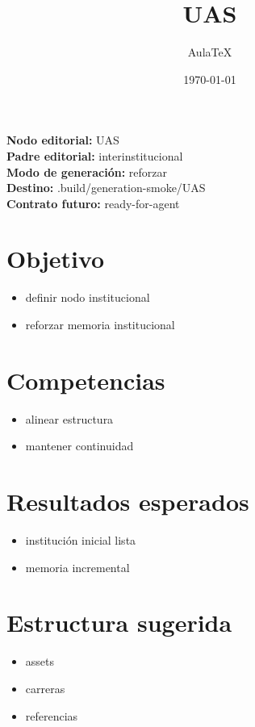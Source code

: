 \documentclass[12pt]{article}
\title{UAS}
\author{AulaTeX}
\date{\today}
\begin{document}
\maketitle

\noindent\textbf{Nodo editorial:} UAS\\
\textbf{Padre editorial:} interinstitucional\\
\textbf{Modo de generación:} reforzar\\
\textbf{Destino:} .build/generation-smoke/UAS\\
\textbf{Contrato futuro:} ready-for-agent

\section*{Objetivo}
\begin{itemize}[leftmargin=*]
  \item definir nodo institucional
  \item reforzar memoria institucional
\end{itemize}

\section*{Competencias}
\begin{itemize}[leftmargin=*]
  \item alinear estructura
  \item mantener continuidad
\end{itemize}

\section*{Resultados esperados}
\begin{itemize}[leftmargin=*]
  \item institución inicial lista
  \item memoria incremental
\end{itemize}

\section*{Estructura sugerida}
\begin{itemize}[leftmargin=*]
  \item assets
  \item carreras
  \item referencias
\end{itemize}
\end{document}
